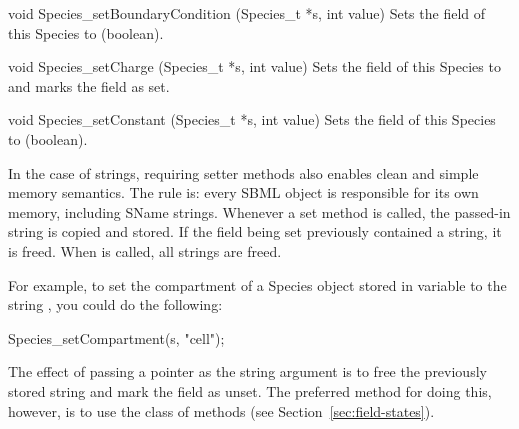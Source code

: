 \documentclass{sbmlmanual}
\begin{document}
\begin{methoddef}{void Species\_setBoundaryCondition (Species\_t *s, int value)}
  Sets the  field of this Species to 
  (boolean).
\end{methoddef}


\begin{methoddef}{void Species\_setCharge (Species\_t *s, int value)}
  Sets the  field of this Species to  and marks the
  field as set.
\end{methoddef}


\begin{methoddef}{void Species\_setConstant (Species\_t *s, int value)}
  Sets the  field of this Species to  (boolean).
\end{methoddef}


In the case of strings, requiring setter methods also enables clean and
simple memory semantics.  The rule is: every SBML object is responsible for
its own memory, including SName strings.  Whenever a set method is called,
the passed-in string is copied and stored.  If the field being set
previously contained a string, it is freed.  When  is
called, all strings are freed.

For example, to set the compartment of a Species object stored in variable
 to the string , you could do the following:

\begin{example}[c]
Species_setCompartment(s, "cell");
\end{example}

The effect of passing a  pointer as the string argument
is to free the previously stored string and mark the field as unset.
The preferred method for doing this, however, is to use the
 class of methods (see
Section~\ref{sec:field-states}).



\end{document}
